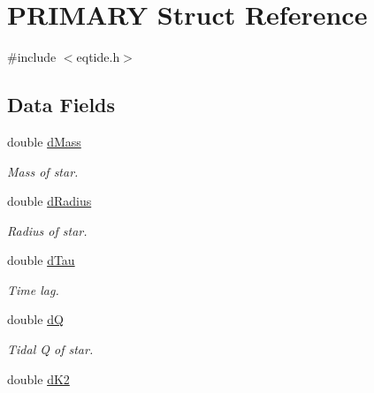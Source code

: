 \hypertarget{struct_p_r_i_m_a_r_y}{}\section{P\+R\+I\+M\+A\+R\+Y Struct Reference}
\label{struct_p_r_i_m_a_r_y}


{\ttfamily \#include $<$eqtide.\+h$>$}

\subsection*{Data Fields}
\begin{DoxyCompactItemize}
\item 
\hypertarget{struct_p_r_i_m_a_r_y_ac55062fb63a07b9339255bf251272f07}{}double \hyperlink{struct_p_r_i_m_a_r_y_ac55062fb63a07b9339255bf251272f07}{d\+Mass}\label{struct_p_r_i_m_a_r_y_ac55062fb63a07b9339255bf251272f07}

\begin{DoxyCompactList}\small\item\em Mass of star. \end{DoxyCompactList}\item 
\hypertarget{struct_p_r_i_m_a_r_y_a59fa36face91f168b6c8c7fa5a94a5ff}{}double \hyperlink{struct_p_r_i_m_a_r_y_a59fa36face91f168b6c8c7fa5a94a5ff}{d\+Radius}\label{struct_p_r_i_m_a_r_y_a59fa36face91f168b6c8c7fa5a94a5ff}

\begin{DoxyCompactList}\small\item\em Radius of star. \end{DoxyCompactList}\item 
\hypertarget{struct_p_r_i_m_a_r_y_ae3489eb549e7293706487fbfd9dfd76f}{}double \hyperlink{struct_p_r_i_m_a_r_y_ae3489eb549e7293706487fbfd9dfd76f}{d\+Tau}\label{struct_p_r_i_m_a_r_y_ae3489eb549e7293706487fbfd9dfd76f}

\begin{DoxyCompactList}\small\item\em Time lag. \end{DoxyCompactList}\item 
\hypertarget{struct_p_r_i_m_a_r_y_aacfd8193e8d1d5a8cca3dd60e4c714f0}{}double \hyperlink{struct_p_r_i_m_a_r_y_aacfd8193e8d1d5a8cca3dd60e4c714f0}{d\+Q}\label{struct_p_r_i_m_a_r_y_aacfd8193e8d1d5a8cca3dd60e4c714f0}

\begin{DoxyCompactList}\small\item\em Tidal Q of star. \end{DoxyCompactList}\item 
\hypertarget{struct_p_r_i_m_a_r_y_a1b217c07355662a21b58401682725a73}{}double \hyperlink{struct_p_r_i_m_a_r_y_a1b217c07355662a21b58401682725a73}{d\+K2}\label{struct_p_r_i_m_a_r_y_a1b217c07355662a21b58401682725a73}


\end{DoxyCompactItemize}
